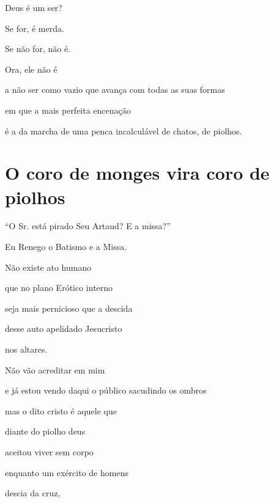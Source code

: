 Deus é um ser?

Se for, é merda.

Se não for, não é.

Ora, ele não é

a não ser como vazio que avança com todas as suas formas

em que a mais perfeita encenação

é a da marcha de uma penca incalculável de chatos, de piolhos.

\chapter{O coro de monges vira coro de piolhos}





``O Sr. está pirado Seu Artaud? E a missa?''


Eu Renego o Batismo e a Missa.

Não existe ato humano 

que no plano Erótico interno

seja mais pernicioso que a descida

desse auto apelidado Jesucristo

nos altares.

Não vão acreditar em mim

e já estou vendo daqui o público sacudindo os ombros

mas o dito cristo é aquele que


diante do piolho deus

aceitou viver sem corpo

enquanto um exército de homens

descia da cruz,

